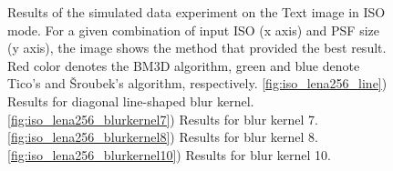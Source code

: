 \documentclass[12pt,notitlepage]{report}
\begin{document}
\begin{figure}[h]
  \caption[Simulated-data experiment on the Text image in ISO mode]{Results of the simulated data experiment on the Text image in ISO mode. For a given combination of input ISO (x axis) and PSF size (y axis), the image shows the method that provided the best result. Red color denotes the BM3D algorithm, green and blue denote Tico's and Šroubek's algorithm, respectively. \ref{fig:iso_lena256_line}) Results for diagonal line-shaped blur kernel. \ref{fig:iso_lena256_blurkernel7}) Results for blur kernel 7. \ref{fig:iso_lena256_blurkernel8}) Results for blur kernel 8. \ref{fig:iso_lena256_blurkernel10}) Results for blur kernel 10.}
  \label{fig:iso_text256}
\end{figure}

\clearpage
\end{document}
